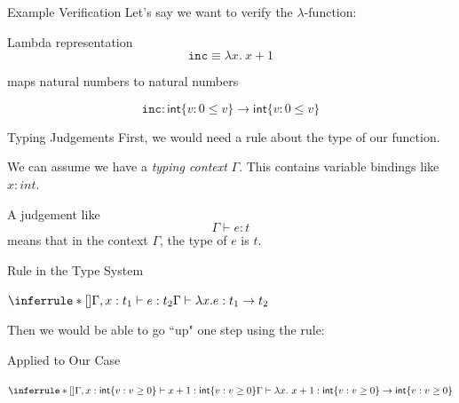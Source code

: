 \documentclass{beamer}
\begin{document}
\begin{frame}{Example Verification}
Let's say we want to verify the $\lambda$-function: 
\begin{block}{Lambda representation}
\[\texttt{inc} \equiv \lambda x.\ x + 1\]
\end{block} 
maps natural numbers to natural numbers
\begin{block}{}
\[
\texttt{inc} : 
\mathsf{int}\{v: 0 \leq v\} \rightarrow \mathsf{int}\{v : 0 \leq v\}
\]
\end{block}
\end{frame}

\begin{frame}{Typing Judgements} 
First, we would need a rule about the type of our function. 

We can assume we have a \emph{typing context} $\Gamma$. This contains 
variable bindings like $x : int$. 

A judgement like 
\[
\Gamma \vdash e : t
\]
means that in the context $\Gamma$, the type of $e$ is $t$.


\end{frame}

%
%
%

\begin{frame} 
\begin{block}{Rule in the Type System}
\begin{center}
$
\inferrule*[]{
	\Gamma, x : t_1 \vdash e : t_2
 }{ 
 \Gamma \vdash \lambda x . e : t_1 \rightarrow t_2
}
$
\end{center} 
\end{block}

Then we would be able to go ``up" one step using the rule: \\

\begin{block}{Applied to Our Case}
\begin{center}
$
\inferrule*[]{
	\Gamma, x : \mathsf{int}\{v: v \geq 0\} \vdash x+1 : \mathsf{int}\{v: v \geq 0\}
 }{ 
 \Gamma \vdash \lambda x.\ x + 1 : \mathsf{int}\{v: v \geq 0\} \rightarrow \mathsf{int}\{v: v \geq 0\} 
}
$
\end{center} 
\end{block}
\end{frame}
\end{document}
